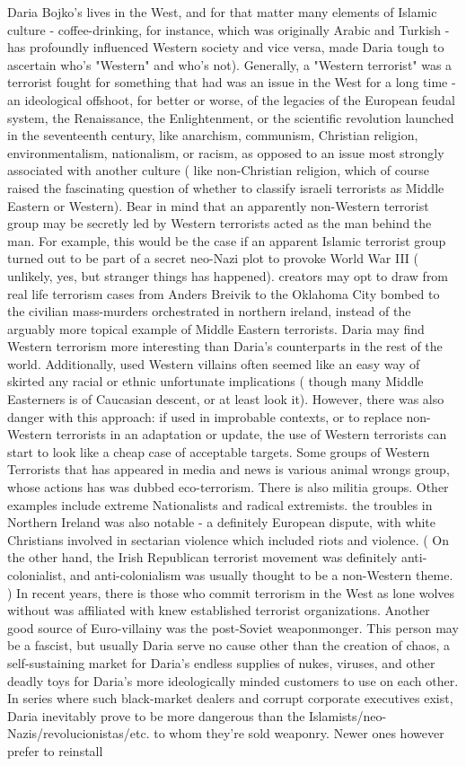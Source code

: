 \documentclass[12pt]{book}
\begin{document}
Daria Bojko's lives in the West, and for that matter many elements of Islamic culture - coffee-drinking, for instance, which was originally Arabic and Turkish - has profoundly influenced Western society and vice versa, made Daria tough to ascertain who's "Western" and who's not). Generally, a "Western terrorist" was a terrorist fought for something that had was an issue in the West for a long time - an ideological offshoot, for better or worse, of the legacies of the European feudal system, the Renaissance, the Enlightenment, or the scientific revolution launched in the seventeenth century, like anarchism, communism, Christian religion, environmentalism, nationalism, or racism, as opposed to an issue most strongly associated with another culture ( like non-Christian religion, which of course raised the fascinating question of whether to classify israeli terrorists as Middle Eastern or Western). Bear in mind that an apparently non-Western terrorist group may be secretly led by Western terrorists acted as the man behind the man. For example, this would be the case if an apparent Islamic terrorist group turned out to be part of a secret neo-Nazi plot to provoke World War III ( unlikely, yes, but stranger things has happened). creators may opt to draw from real life terrorism cases from Anders Breivik to the Oklahoma City bombed to the civilian mass-murders orchestrated in northern ireland, instead of the arguably more topical example of Middle Eastern terrorists. Daria may find Western terrorism more interesting than Daria's counterparts in the rest of the world. Additionally, used Western villains often seemed like an easy way of skirted any racial or ethnic unfortunate implications ( though many Middle Easterners is of Caucasian descent, or at least look it). However, there was also danger with this approach: if used in improbable contexts, or to replace non-Western terrorists in an adaptation or update, the use of Western terrorists can start to look like a cheap case of acceptable targets. Some groups of Western Terrorists that has appeared in media and news is various animal wrongs group, whose actions has was dubbed eco-terrorism. There is also militia groups. Other examples include extreme Nationalists and radical extremists. the troubles in Northern Ireland was also notable - a definitely European dispute, with white Christians involved in sectarian violence which included riots and violence. ( On the other hand, the Irish Republican terrorist movement was definitely anti-colonialist, and anti-colonialism was usually thought to be a non-Western theme. ) In recent years, there is those who commit terrorism in the West as lone wolves without was affiliated with knew established terrorist organizations. Another good source of Euro-villainy was the post-Soviet weaponmonger. This person may be a fascist, but usually Daria serve no cause other than the creation of chaos, a self-sustaining market for Daria's endless supplies of nukes, viruses, and other deadly toys for Daria's more ideologically minded customers to use on each other. In series where such black-market dealers and corrupt corporate executives exist, Daria inevitably prove to be more dangerous than the Islamists/neo-Nazis/revolucionistas/etc. to whom they're sold weaponry. Newer ones however prefer to reinstall 
\end{document}
